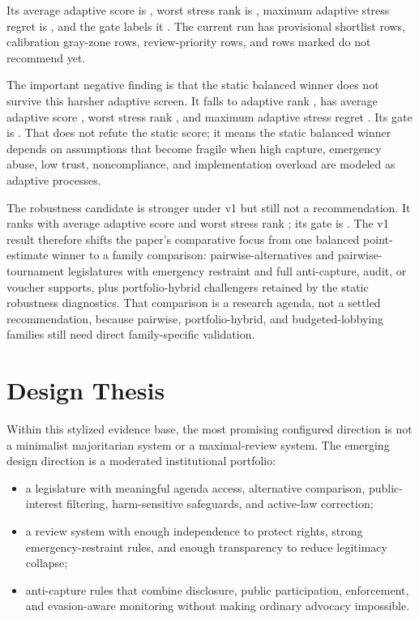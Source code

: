 \documentclass[11pt]{article}
\providecommand{\GeneratedDir}{generated}
\begin{document}
Its average adaptive score is \AdaptiveLeaderScore, worst stress rank is \AdaptiveLeaderWorstStressRank, maximum adaptive stress regret is \AdaptiveLeaderMaxStressRegret, and the gate labels it \AdaptiveLeaderGate. The current run has \AdaptiveProvisionalShortlistCount{} provisional shortlist rows, \AdaptiveCalibrationGrayZoneCount{} calibration gray-zone rows, \AdaptiveReviewPriorityCount{} review-priority rows, and \AdaptiveDoNotRecommendCount{} rows marked do not recommend yet.



The important negative finding is that the static balanced winner does not survive this harsher adaptive screen. It falls to adaptive rank \BalancedAdaptiveRank, has average adaptive score \BalancedAdaptiveScore, worst stress rank \BalancedAdaptiveWorstStressRank, and maximum adaptive stress regret \BalancedAdaptiveMaxStressRegret. Its gate is \BalancedAdaptiveGate. That does not refute the static score; it means the static balanced winner depends on assumptions that become fragile when high capture, emergency abuse, low trust, noncompliance, and implementation overload are modeled as adaptive processes.

The robustness candidate is stronger under v1 but still not a recommendation. It ranks \RobustAdaptiveRank{} with average adaptive score \RobustAdaptiveScore{} and worst stress rank \RobustAdaptiveWorstStressRank; its gate is \RobustAdaptiveGate. The v1 result therefore shifts the paper's comparative focus from one balanced point-estimate winner to a family comparison: pairwise-alternatives and pairwise-tournament legislatures with emergency restraint and full anti-capture, audit, or voucher supports, plus portfolio-hybrid challengers retained by the static robustness diagnostics. That comparison is a research agenda, not a settled recommendation, because pairwise, portfolio-hybrid, and budgeted-lobbying families still need direct family-specific validation.

\section{Design Thesis}

Within this stylized evidence base, the most promising configured direction is not a minimalist majoritarian system or a maximal-review system. The emerging design direction is a moderated institutional portfolio:

\begin{itemize}
  \item a legislature with meaningful agenda access, alternative comparison, public-interest filtering, harm-sensitive safeguards, and active-law correction;
  \item a review system with enough independence to protect rights, strong emergency-restraint rules, and enough transparency to reduce legitimacy collapse;
  \item anti-capture rules that combine disclosure, public participation, enforcement, and evasion-aware monitoring without making ordinary advocacy impossible.
\end{itemize}
\end{document}

